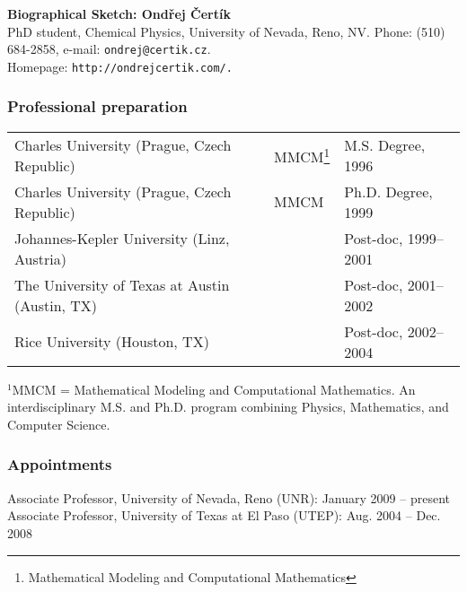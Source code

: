 \documentclass[11pt,letterpaper]{article}
\begin{document}
\begin{center}
\vbox{}
\vspace{-1.9cm}
{\Large \bf Biographical Sketch: Ondřej Čertík}\\
\vspace{4mm}
PhD student, Chemical Physics, University of Nevada, Reno, NV.
Phone: (510) 684-2858, e-mail: {\tt ondrej@certik.cz}.\\
Homepage: {\tt http://ondrejcertik.com/.}
\end{center}

\subsubsection*{Professional preparation}
\hspace{-3.4mm}
\begin{tabular}{lll}
Charles University (Prague, Czech Republic) & MMCM\thanks{Mathematical Modeling and Computational Mathematics} 
&  M.S. Degree, 1996\\
Charles University (Prague, Czech Republic) & MMCM & Ph.D. Degree, 1999 \\
Johannes-Kepler University (Linz, Austria) &  & Post-doc, 1999--2001 \\
The University of Texas at Austin (Austin, TX) &  & Post-doc, 2001--2002 \\
Rice University (Houston, TX) & & Post-doc, 2002--2004\\[3mm]
\end{tabular}

\noindent
${}^1$MMCM = Mathematical Modeling and Computational Mathematics. An interdisciplinary M.S. and Ph.D.
program combining Physics, Mathematics, and Computer Science.

\subsubsection*{Appointments}

Associate Professor, University of Nevada, Reno (UNR): January 2009 -- present \\
Associate Professor, University of Texas at El Paso (UTEP): Aug. 2004 -- Dec. 2008 
\end{document}

